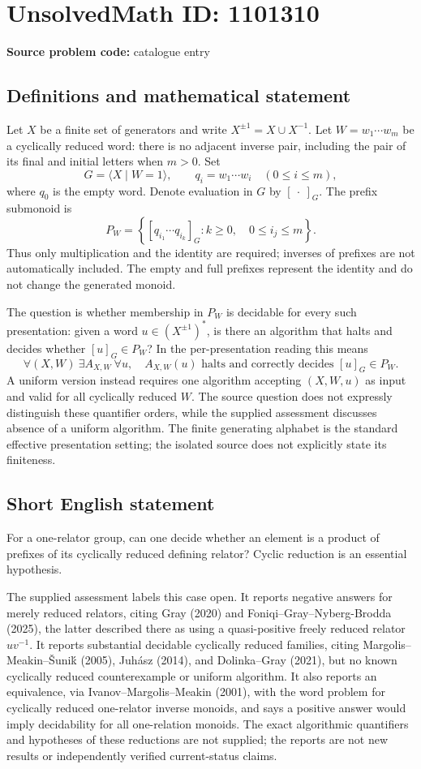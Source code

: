 \documentclass[11pt]{article}
\begin{document}
\section*{UnsolvedMath ID: 1101310}
\textbf{Source problem code:} catalogue entry
\subsection{Definitions and mathematical statement}
Let $X$ be a finite set of generators and write $X^{\pm1}=X\cup X^{-1}$. Let $W=w_1\cdots w_m$ be a cyclically reduced word: there is no adjacent inverse pair, including the pair of its final and initial letters when $m>0$. Set
\[
 G=\langle X\mid W=1\rangle,
 \qquad q_i=w_1\cdots w_i\quad(0\leq i\leq m),
\]
where $q_0$ is the empty word. Denote evaluation in $G$ by $[\ \cdot\ ]_G$. The prefix submonoid is
\[
 P_W=\left\{[q_{i_1}\cdots q_{i_k}]_G:
 k\geq0,\quad 0\leq i_j\leq m\right\}.
\]
Thus only multiplication and the identity are required; inverses of prefixes are not automatically included. The empty and full prefixes represent the identity and do not change the generated monoid.

The question is whether membership in $P_W$ is decidable for every such presentation: given a word $u\in(X^{\pm1})^*$, is there an algorithm that halts and decides whether $[u]_G\in P_W$? In the per-presentation reading this means
\[
 \forall (X,W)\ \exists A_{X,W}\ \forall u,
 \quad A_{X,W}(u)\text{ halts and correctly decides }[u]_G\in P_W.
\]
A uniform version instead requires one algorithm accepting $(X,W,u)$ as input and valid for all cyclically reduced $W$. The source question does not expressly distinguish these quantifier orders, while the supplied assessment discusses absence of a uniform algorithm. The finite generating alphabet is the standard effective presentation setting; the isolated source does not explicitly state its finiteness.
\subsection{Short English statement}
For a one-relator group, can one decide whether an element is a product of prefixes of its cyclically reduced defining relator? Cyclic reduction is an essential hypothesis.

The supplied assessment labels this case open. It reports negative answers for merely reduced relators, citing Gray (2020) and Foniqi--Gray--Nyberg-Brodda (2025), the latter described there as using a quasi-positive freely reduced relator $uv^{-1}$. It reports substantial decidable cyclically reduced families, citing Margolis--Meakin--Šuniḱ (2005), Juhász (2014), and Dolinka--Gray (2021), but no known cyclically reduced counterexample or uniform algorithm. It also reports an equivalence, via Ivanov--Margolis--Meakin (2001), with the word problem for cyclically reduced one-relator inverse monoids, and says a positive answer would imply decidability for all one-relation monoids. The exact algorithmic quantifiers and hypotheses of these reductions are not supplied; the reports are not new results or independently verified current-status claims.
\end{document}
